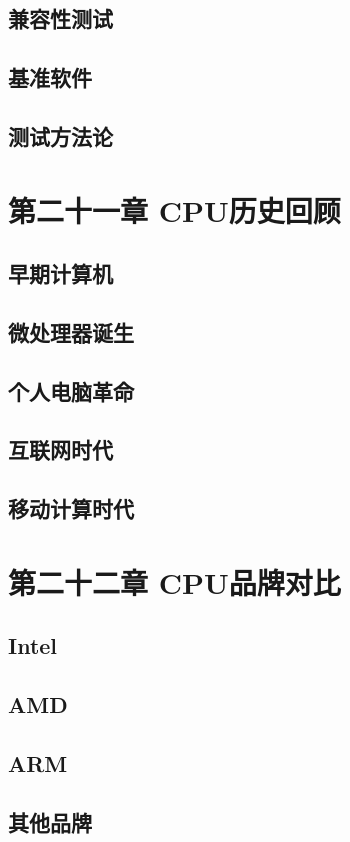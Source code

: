 \documentclass[12pt,UTF8]{ctexbook}
\begin{document}
\section{兼容性测试}
\section{基准软件}
\section{测试方法论}

\chapter{第二十一章 CPU历史回顾}

\section{早期计算机}
\section{微处理器诞生}
\section{个人电脑革命}
\section{互联网时代}
\section{移动计算时代}

\chapter{第二十二章 CPU品牌对比}

\section{Intel}
\section{AMD}
\section{ARM}
\section{其他品牌}
\end{document}
